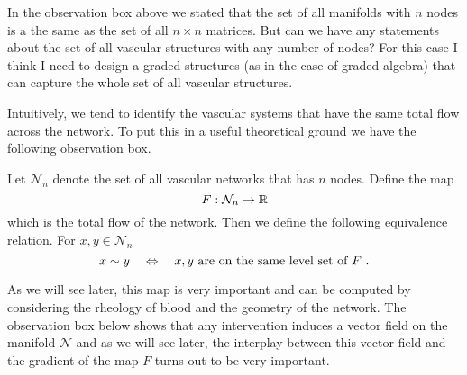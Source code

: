 \begin{remark}
	In the observation box above we stated that the set of all manifolds with $ n $ nodes is a the same as the set of all $ n\times n $ matrices. But can we have any statements about the set of all vascular structures with any number of nodes? For this case I think I need to design a graded structures (as in the case of graded algebra) that can capture the whole set of all vascular structures.
\end{remark}

Intuitively, we tend to identify the vascular systems that have the same total flow across the network. To put this in a useful theoretical ground we have the following observation box.

\begin{observation}
	Let $ \mathcal{N}_n $ denote the set of all vascular networks that has $ n $ nodes. Define the map
	\[ F: \mathcal{N}_n \to \mathbb{R} \]
	which is the total flow of the network. Then we define the following equivalence relation. For $ x,y \in \mathcal{N}_n $
	\[ x \sim y \quad \Leftrightarrow \quad x,y \text{ are on the same level set of $ F $ }. \]
\end{observation}
As we will see later, this map is very important and can be computed by considering the rheology of blood and the geometry of the network. The observation box below shows that any intervention induces a vector field on the manifold $ \mathcal{N} $ and as we will see later, the interplay between this vector field and the gradient of the map $ F $ turns out to be very important. 

